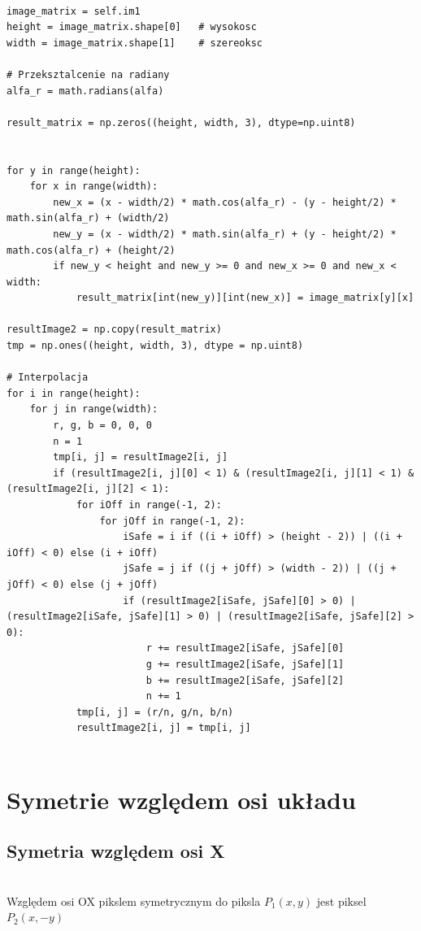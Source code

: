 \documentclass[final,a4paper,openany,12pt]{mwbk}
\begin{document}
\begin{lstlisting}[caption=Obracanie obrazu o dowolny kąt]

image_matrix = self.im1
height = image_matrix.shape[0]   # wysokosc
width = image_matrix.shape[1]    # szereoksc

# Przeksztalcenie na radiany
alfa_r = math.radians(alfa)

result_matrix = np.zeros((height, width, 3), dtype=np.uint8)


for y in range(height):
    for x in range(width): 
        new_x = (x - width/2) * math.cos(alfa_r) - (y - height/2) * math.sin(alfa_r) + (width/2)
        new_y = (x - width/2) * math.sin(alfa_r) + (y - height/2) * math.cos(alfa_r) + (height/2)
        if new_y < height and new_y >= 0 and new_x >= 0 and new_x < width:
            result_matrix[int(new_y)][int(new_x)] = image_matrix[y][x]

resultImage2 = np.copy(result_matrix)
tmp = np.ones((height, width, 3), dtype = np.uint8)

# Interpolacja
for i in range(height):
    for j in range(width):
        r, g, b = 0, 0, 0
        n = 1
        tmp[i, j] = resultImage2[i, j]
        if (resultImage2[i, j][0] < 1) & (resultImage2[i, j][1] < 1) & (resultImage2[i, j][2] < 1):
            for iOff in range(-1, 2):
                for jOff in range(-1, 2):
                    iSafe = i if ((i + iOff) > (height - 2)) | ((i + iOff) < 0) else (i + iOff)
                    jSafe = j if ((j + jOff) > (width - 2)) | ((j + jOff) < 0) else (j + jOff)
                    if (resultImage2[iSafe, jSafe][0] > 0) | (resultImage2[iSafe, jSafe][1] > 0) | (resultImage2[iSafe, jSafe][2] > 0):
                        r += resultImage2[iSafe, jSafe][0]
                        g += resultImage2[iSafe, jSafe][1]
                        b += resultImage2[iSafe, jSafe][2]
                        n += 1
            tmp[i, j] = (r/n, g/n, b/n)
            resultImage2[i, j] = tmp[i, j]


\end{lstlisting}
\newpage

\section{ Symetrie względem osi układu}

\subsection*{ Symetria względem osi X}
\hfill\\
\indent
Względem osi OX pikslem symetrycznym do piksla $P_{1}(x,y)$ jest piksel $P_{2}(x,-y)$
	
\end{document}
